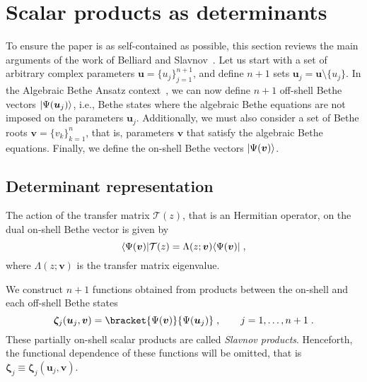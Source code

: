 \documentclass[a4paper,12pt]{amsart}
\begin{document}
\section{Scalar products as determinants}

To ensure the paper is as self-contained as possible, this section
reviews the main arguments of the work of Belliard and
Slavnov~\cite{Belliard:2019bfz}. Let us start with a set of arbitrary
complex parameters \(\bm{u} = \{u_j\}_{j=1}^{n+1}\), and define
\(n+1\) sets \(\bm{u}_j=\bm{u}\setminus \{u_j\}\). In the Algebraic
Bethe Ansatz context~\cite{Korepin:1993kvr, Slavnov:2019aba}, we can
now define \(n+1\) off-shell Bethe vectors \(\lvert\Psi(\bm{u}_j)\rangle\),
i.e., Bethe states where the algebraic Bethe equations are not imposed
on the parameters \(\bm{u}_j\). Additionally, we must also consider a
set of Bethe roots \(\bm{v} = \{ v_k \}_{k=1}^n\), that is, parameters
\(\bm{v}\) that satisfy the algebraic Bethe equations. Finally, we
define the on-shell Bethe vectors \(\lvert\Psi(\bm{v})\rangle\).


\subsection{Determinant representation}
The action of the transfer matrix \(\mathcal{T}(z)\), that is an
Hermitian operator, on the dual on-shell Bethe vector is given by
\begin{equation}
\label{eq:eigenvalue-bethe}
\langle\Psi(\bm{v})\rvert\mathcal{T}(z) = \Lambda(z; \bm{v}) \langle\Psi(\bm{v})\rvert \; , 
\end{equation}
where \(\Lambda(z; \bm{v}) \) is the transfer matrix eigenvalue.

We construct \(n+1\) functions obtained from products between the
on-shell and each off-shell Bethe states
\begin{equation}
  \bm{\zeta}_j(\bm{u}_j, \bm{v}) 
  = \bracket{\Psi(\bm{v})}{\Psi(\bm{u}_j)}\; ,\qquad j =1, \dots, n+1\; .
\end{equation}
These partially on-shell scalar products are called \emph{Slavnov
products}.  Henceforth, the functional dependence of these functions
will be omitted, that is \(\bm{\zeta}_j\equiv \bm{\zeta}_j(\bm{u}_j,
\bm{v})\).
\end{document}
